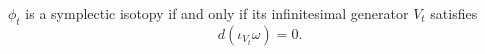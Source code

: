 

    $\phi_t$ is a symplectic isotopy if and only if its infinitesimal generator $V_t$ satisfies 
    \[d(\iota_{V_t}\omega)=0.\]

